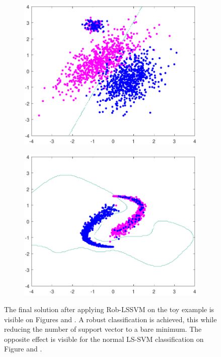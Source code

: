 \documentclass[preprint,12pt]{elsarticle}
\begin{document}
\begin{figure}[!htb]
		\begin{subfigure}[b]{0.40\linewidth}
			\centering\includegraphics[width=1\linewidth]{figures/normdatamodel_hyperplane_lssvm}
			\caption{\label{fig:solNorm1}} 
		\end{subfigure} 
		\begin{subfigure}[b]{0.40\linewidth}
			\centering\includegraphics[width=1\linewidth]{figures/yydatamodel_hyperplane_lssvm.pdf}
			\caption{\label{fig:solNorm2}}
		\end{subfigure} 
		\caption{The final solution after applying Rob-LSSVM on the toy example is visible on Figures  and . A robust classification is achieved, this while reducing the number of support vector to a bare minimum. The opposite effect is visible for the normal LS-SVM classification on Figure  and . }
		\label{fig:results}
	\end{figure}
	
\end{document}
